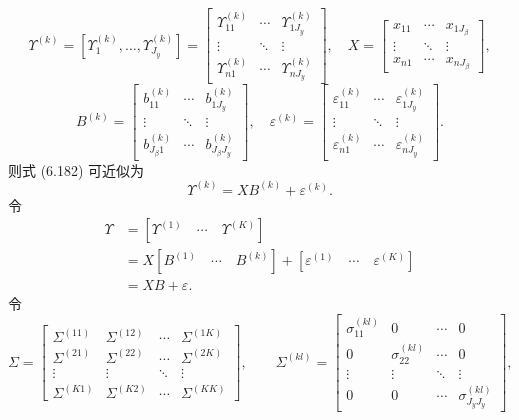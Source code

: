 \[
\Upsilon^{(k)}=[\Upsilon_1^{(k)},\ldots,\Upsilon_{J_y}^{(k)}]=\begin{bmatrix}
\Upsilon_{11}^{(k)}&\cdots&\Upsilon_{1J_y}^{(k)}\\\vdots&\ddots&\vdots\\\Upsilon_{n1}^{(k)}&\cdots&\Upsilon_{nJ_y}^{(k)}
\end{bmatrix},\quad
X=\begin{bmatrix}x_{11}&\cdots&x_{1J_\beta}\\\vdots&\ddots&\vdots\\x_{n1}&\cdots&x_{nJ_\beta}\end{bmatrix},
\]
\[
B^{(k)}=\begin{bmatrix}b_{11}^{(k)}&\cdots&b_{1J_y}^{(k)}\\\vdots&\ddots&\vdots\\b_{J_\beta1}^{(k)}&\cdots&b_{J_\beta J_y}^{(k)}\end{bmatrix},\quad
\varepsilon^{(k)}=\begin{bmatrix}\varepsilon_{11}^{(k)}&\cdots&\varepsilon_{1J_y}^{(k)}\\\vdots&\ddots&\vdots\\\varepsilon_{n1}^{(k)}&\cdots&\varepsilon_{nJ_y}^{(k)}\end{bmatrix}.
\]
则式 (6.182) 可近似为
\begin{equation}
\Upsilon^{(k)}=XB^{(k)}+\varepsilon^{(k)}.
\tag{6.185}
\end{equation}
令
\begin{equation}
\begin{aligned}
\Upsilon&=[\Upsilon^{(1)}\quad\cdots\quad\Upsilon^{(K)}]\\
&=X[B^{(1)}\quad\cdots\quad B^{(k)}]+[\varepsilon^{(1)}\quad\cdots\quad\varepsilon^{(K)}]\\
&=XB+\varepsilon.
\end{aligned}\tag{6.186}
\end{equation}
令
\[
\Sigma=\begin{bmatrix}
\Sigma^{(11)}&\Sigma^{(12)}&\cdots&\Sigma^{(1K)}\\
\Sigma^{(21)}&\Sigma^{(22)}&\cdots&\Sigma^{(2K)}\\
\vdots&\vdots&\ddots&\vdots\\
\Sigma^{(K1)}&\Sigma^{(K2)}&\cdots&\Sigma^{(KK)}
\end{bmatrix},\qquad
\Sigma^{(kl)}=\begin{bmatrix}
\sigma_{11}^{(kl)}&0&\cdots&0\\0&\sigma_{22}^{(kl)}&\cdots&0\\\vdots&\vdots&\ddots&\vdots\\0&0&\cdots&\sigma_{J_yJ_y}^{(kl)}
\end{bmatrix},
\]
